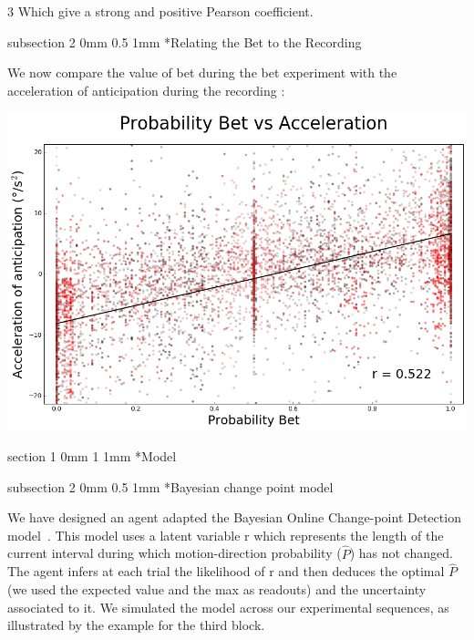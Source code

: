 \documentclass[profile,final,english, draft]{article}%
\makeatletter
\renewcommand{\section}{\@startsection
        {section}%
        {1}%
        {0mm}%
        {1\baselineskip}%
        {1mm}%
        {\large\color{red}\bfseries}}%
\renewcommand{\subsection}{\@startsection
        {subsection}%
        {2}%
        {0mm}%
        {0.5\baselineskip}%
        {1mm}%
        {\normalsize\color[rgb]{0.4,0,0}\bfseries}}%
\makeatother
\begin{document}
\begin{multicols}{3}
Which give a strong and positive Pearson coefficient.

\subsection*{Relating the Bet to the Recording}

We now compare the value of bet during the bet experiment with the acceleration of anticipation during the recording :


\begin{center} 
    \includegraphics[width=1\columnwidth]{p_bet--v_a}
\end{center}

\columnbreak

\section*{Model}

\subsection*{Bayesian change point model}

We have designed an agent adapted the Bayesian Online Change-point Detection model~\parencite{AdamsMackay2007}. This model uses a latent variable r which represents the length of the current interval during which motion-direction probability ($\hat{P}$) has not changed. The agent infers at each trial the likelihood  of r and then deduces the optimal $\hat{P}$ (we used the expected value and the max as readouts) and the uncertainty associated to it. We simulated the model across our experimental sequences, as illustrated by the example for the third block.



\end{multicols}
\end{document}
